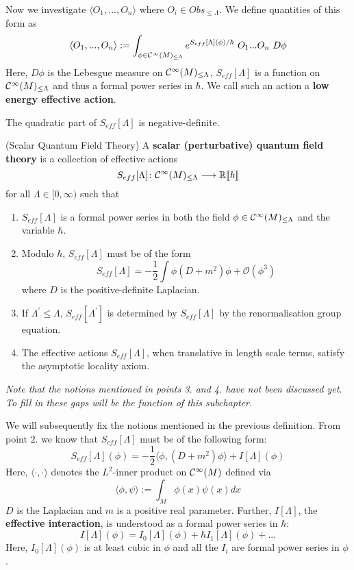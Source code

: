Now we investigate $\langle O_1, ..., O_n \rangle$ where $O_i \in Obs_{\leq \Lambda}$. We define quantities of this form as
$$ \langle O_1, ..., O_n \rangle := \int_{\phi \in \Ci(M)_{\leq \Lambda}} e^{S_{eff}[\Lambda](\phi) / \hbar} \ O_1 ... O_n \ D\phi$$
Here, $D\phi$ is the Lebesgue measure on $\mathcal{C}^{\infty}(M)_{\leq \Lambda}$, $S_{eff}[\Lambda]$ is a function on $\mathcal{C}^{\infty}(M)_{\leq \Lambda}$ and thus a formal power series in $\hbar$. We call such an action a \textbf{low energy effective action}.

\begin{rem}
  The quadratic part of $S_{eff}[\Lambda]$ is negative-definite.
\end{rem}

\begin{definition}(Scalar Quantum Field Theory)
\label{def:scalar_qft}
  A \textbf{scalar (perturbative) quantum field theory} is a collection of effective actions
  $$ S_{eff}[\Lambda]\colon \mathcal{C}^{\infty}(M)_{\leq \Lambda} \longrightarrow \mathbb{R}\llbracket\hbar\rrbracket $$
  for all $\Lambda \in [0,\infty)$ such that
  \begin{enumerate}
    \item $S_{eff}[\Lambda]$ is a formal power series in both the field $\phi \in \Ci(M)_{\leq \Lambda}$ and the variable $\hbar$.

    \item Modulo $\hbar$, $S_{eff}[\Lambda]$ must be of the form
    $$ S_{eff}[\Lambda] = - \frac{1}{2} \int \phi (D + m^2) \phi + \mathcal{O}(\phi^3) $$
    where $D$ is the positive-definite Laplacian.

    \item If $\Lambda^\prime \leq \Lambda$, $S_{eff}[\Lambda^\prime]$ is determined by $S_{eff}[\Lambda]$ by the renormalisation group equation.

    \item The effective actions $S_{eff}[\Lambda]$, when translative in length scale terms, satisfy the asymptotic locality axiom.
  \end{enumerate}
  \emph{Note that the notions mentioned in points 3. and 4. have not been discussed yet. To fill in these gaps will be the function of this subchapter.}
\end{definition}

We will subsequently fix the notions mentioned in the previous definition. From point $2.$ we know that $S_{eff}[\Lambda]$ must be of the following form:
$$S_{eff}[\Lambda](\phi) = - \frac{1}{2} \langle \phi, (D+m^2)\phi \rangle + I[\Lambda](\phi) $$
Here, $\langle \cdot , \cdot \rangle$ denotes the $L^2$-inner product on $\mathcal{C}^{\infty}(M)$ defined via
$$ \langle \phi , \psi \rangle := \int_M \phi(x) \psi(x) dx$$
$D$ is the Laplacian and $m$ is a positive real parameter. Further, $I[\Lambda]$, the \textbf{effective interaction}, is understood as a formal power series in $\hbar$:
$$ I[\Lambda](\phi) = I_0[\Lambda](\phi) + \hbar I_1[\Lambda](\phi) + ... $$
Here, $I_0[\Lambda](\phi)$ is at least cubic in $\phi$ and all the $I_i$ are formal power series in $\phi$.\\

